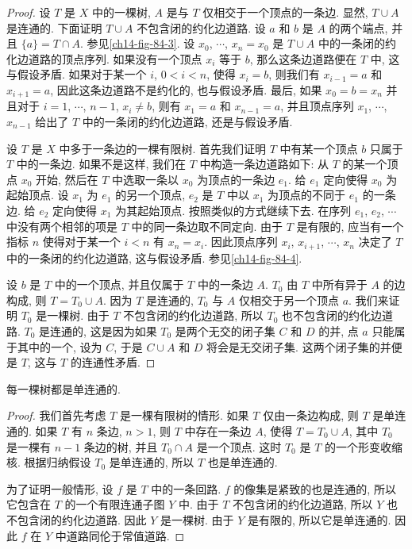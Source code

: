 \begin{proof}
设 $T$ 是 $X$ 中的一棵树, $A$ 是与 $T$ 仅相交于一个顶点的一条边. 显然, $T\cup A$ 是连通的. 下面证明 $T\cup A$ 不包含闭的约化边道路. 设 $a$ 和 $b$ 是 $A$ 的两个端点, 并且 $\{a\}=T\cap A$. 参见\cref{ch14-fig-84-3}. 设 $x_{0}$, $\cdots$, $x_{n}=x_{0}$ 是 $T\cup A$ 中的一条闭的约化边道路的顶点序列. 如果没有一个顶点 $x_{i}$ 等于 $b$, 那么这条边道路便在 $T$ 中, 这与假设矛盾. 如果对于某一个 $i$, $0<i<n$, 使得 $x_{i}=b$, 则我们有 $x_{i-1}=a$ 和 $x_{i+1}=a$, 因此这条边道路不是约化的, 也与假设矛盾. 最后, 如果 $x_{0}=b=x_{n}$ 并且对于 $i=1$, $\cdots$, $n-1$, $x_{i}\neq b$, 则有 $x_{1}=a$ 和 $x_{n-1}=a$, 并且顶点序列 $x_{1}$, $\cdots$, $x_{n-1}$ 给出了 $T$ 中的一条闭的约化边道路, 还是与假设矛盾.

设 $T$ 是 $X$ 中多于一条边的一棵有限树. 首先我们证明 $T$ 中有某一个顶点 $b$ 只属于 $T$ 中的一条边. 如果不是这样, 我们在 $T$ 中构造一条边道路如下: 从 $T$ 的某一个顶点 $x_{0}$ 开始, 然后在 $T$ 中选取一条以 $x_{0}$ 为顶点的一条边 $e_{1}$. 给 $e_{1}$ 定向使得 $x_{0}$ 为起始顶点. 设 $x_{1}$ 为 $e_{1}$ 的另一个顶点, $e_{2}$ 是 $T$ 中以 $x_{1}$ 为顶点的不同于 $e_{1}$ 的一条边. 给 $e_{2}$ 定向使得 $x_{1}$ 为其起始顶点. 按照类似的方式继续下去. 在序列 $e_{1}$, $e_{2}$, $\cdots$ 中没有两个相邻的项是 $T$ 中的同一条边取不同定向. 由于 $T$ 是有限的, 应当有一个指标 $n$ 使得对于某一个 $i<n$ 有 $x_{n}=x_{i}$. 因此顶点序列 $x_{i}$, $x_{i+1}$, $\cdots$, $x_{n}$ 决定了 $T$ 中的一条闭的约化边道路, 这与假设矛盾. 参见\cref{ch14-fig-84-4}.


设 $b$ 是 $T$ 中的一个顶点, 并且仅属于 $T$ 中的一条边 $A$. $T_{0}$ 由 $T$ 中所有异于 $A$ 的边构成, 则 $T=T_{0}\cup A$. 因为 $T$ 是连通的, $T_{0}$ 与 $A$ 仅相交于另一个顶点 $a$. 我们来证明 $T_{0}$ 是一棵树. 由于 $T$ 不包含闭的约化边道路, 所以 $T_{0}$ 也不包含闭的约化边道路. $T_{0}$ 是连通的, 这是因为如果 $T_{0}$ 是两个无交的闭子集 $C$ 和 $D$ 的并, 点 $a$ 只能属于其中的一个, 设为 $C$, 于是 $C\cup A$ 和 $D$ 将会是无交闭子集. 这两个闭子集的并便是 $T$, 这与 $T$ 的连通性矛盾.
\end{proof}

\begin{theorem}[树是单连通的]
\label{theorem:ch14-tree-simply-connected}
每一棵树都是单连通的.
\end{theorem}

\begin{proof}
我们首先考虑 $T$ 是一棵有限树的情形. 如果 $T$ 仅由一条边构成, 则 $T$ 是单连通的. 如果 $T$ 有 $n$ 条边, $n>1$, 则 $T$ 中存在一条边 $A$, 使得 $T=T_{0}\cup A$, 其中 $T_{0}$ 是一棵有 $n-1$ 条边的树, 并且 $T_{0}\cap A$ 是一个顶点. 这时 $T_{0}$ 是 $T$ 的一个形变收缩核. 根据归纳假设 $T_{0}$ 是单连通的, 所以 $T$ 也是单连通的.

为了证明一般情形, 设 $f$ 是 $T$ 中的一条回路. $f$ 的像集是紧致的也是连通的, 所以它包含在 $T$ 的一个有限连通子图 $Y$ 中. 由于 $T$ 不包含闭的约化边道路, 所以 $Y$ 也不包含闭的约化边道路. 因此 $Y$ 是一棵树. 由于 $Y$ 是有限的, 所以它是单连通的. 因此 $f$ 在 $Y$ 中道路同伦于常值道路.
\end{proof}

